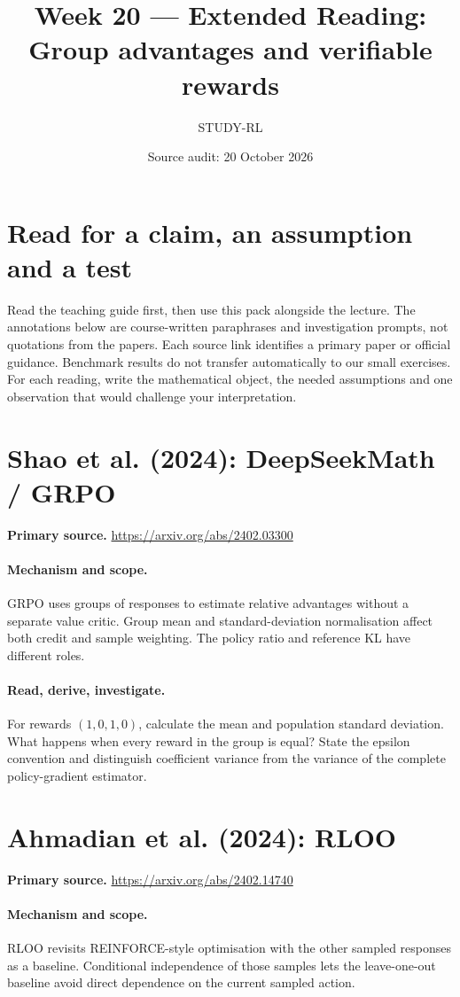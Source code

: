 \documentclass[11pt]{scrartcl}
\title{Week 20 --- Extended Reading: Group advantages and verifiable rewards}
\author{STUDY-RL}
\date{Source audit: 20 October 2026}
\begin{document}
\maketitle
\section*{Read for a claim, an assumption and a test}
Read the teaching guide first, then use this pack alongside the lecture.
The annotations below are course-written paraphrases and investigation prompts,
not quotations from the papers. Each source link identifies a primary paper
or official guidance. Benchmark results do not transfer automatically to our
small exercises. For each reading, write the mathematical object, the needed
assumptions and one observation that would challenge your interpretation.

\section{Shao et al. (2024): DeepSeekMath / GRPO}
\noindent\textbf{Primary source.} \url{https://arxiv.org/abs/2402.03300}

\paragraph{Mechanism and scope.} GRPO uses groups of responses to estimate relative advantages without a separate value critic. Group mean and standard-deviation normalisation affect both credit and sample weighting. The policy ratio and reference KL have different roles.

\paragraph{Read, derive, investigate.} For rewards $(1,0,1,0)$, calculate the mean and population standard deviation. What happens when every reward in the group is equal? State the epsilon convention and distinguish coefficient variance from the variance of the complete policy-gradient estimator.

\section{Ahmadian et al. (2024): RLOO}
\noindent\textbf{Primary source.} \url{https://arxiv.org/abs/2402.14740}

\paragraph{Mechanism and scope.} RLOO revisits REINFORCE-style optimisation with the other sampled responses as a baseline. Conditional independence of those samples lets the leave-one-out baseline avoid direct dependence on the current sampled action.
\end{document}
